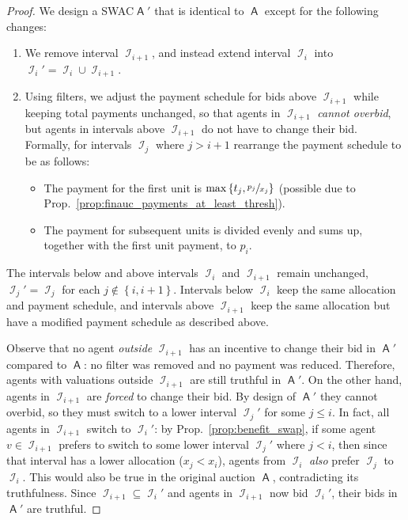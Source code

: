 \documentclass[11pt,letterpaper]{article}
\newcommand{\set}[1]{\left\{#1\right\}}
\newcommand{\swac}{SWAC\xspace}
\DeclareMathOperator{\A}{\auc{A}}
\DeclareMathOperator{\I}{\mathcal{I}}
\theoremstyle{plain}
\newcommand{\auc}[1]{\mathsf{#1}}
\begin{document}
\begin{proof}
We design a \swac $\A'$ that is identical to $\A$ except for the following changes:
\begin{enumerate}
    \item We remove interval $\I_{i+1}$,
    and instead extend interval $\I_i$ into $\I_i' = \I_i \cup \I_{i+1}$.
    \item Using filters, we adjust the payment schedule for bids above $\I_{i+1}$ while keeping total payments unchanged, so  that agents in $\I_{i+1}$ \emph{cannot overbid},
    but agents in intervals above $\I_{i+1}$
    do not have to change their bid. Formally, for intervals $\I_j$ where $j>i+1$ rearrange the payment schedule to be as follows:
            \begin{itemize}
                \item The payment for the first unit is $\max\set{t_j,\sfrac{p_j}{x_j}}$ (possible due to Prop.~\ref{prop:finauc_payments_at_least_thresh}).
                \item The payment for subsequent units is divided evenly and sums up, together with the first unit payment, to $p_i$.
            \end{itemize}
\end{enumerate}
The intervals below and above intervals $\I_i$ and $\I_{i+1}$ remain unchanged,
$\I_j' = \I_j$ for each $j \notin \set{i, i+1}$.
Intervals below $\I_i$ keep the same allocation and payment schedule, and intervals above $\I_{i+1}$ keep the same allocation but have a modified payment schedule as described above.


Observe that no agent
\emph{outside} $\I_{i+1}$
has an incentive to change their bid in $\A'$ compared to $\A$:
no filter was removed and no payment was reduced.
Therefore, agents with valuations outside $\I_{i+1}$ are still truthful in $\A'$.
On the other hand, agents in $\I_{i+1}$ are \emph{forced} to change their bid.
By design of $\A'$ they cannot overbid,
so they must switch to a lower interval $\I_j'$
for some $j \leq i$.
In fact, all agents in $\I_{i+1}$
switch to $\I_i'$:
by Prop.~\ref{prop:benefit_swap},
if some agent $v \in \I_{i+1}$
prefers to switch to some lower interval $\I_j'$
where $j < i$,
then 
since that interval has a lower allocation ($x_j < x_i$),
agents from $\I_i$ \emph{also}
prefer $\I_j$ to $\I_i$.
This would also be true in the original auction $\A$,
contradicting its truthfulness.
Since $\I_{i+1} \subseteq \I_i'$ and agents in $\I_{i+1}$
now bid $\I_i'$,
their bids in $\A'$ are truthful.


\end{proof}
\end{document}
